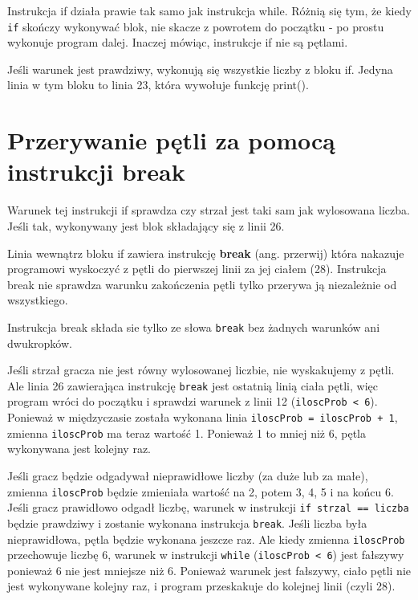 \documentclass{book}
\begin{document}
Instrukcja if działa prawie tak samo jak instrukcja while. Różnią się tym, że kiedy \lstinline{if} skończy wykonywać blok, nie skacze z powrotem do początku - po prostu wykonuje program dalej. Inaczej mówiąc, instrukcje if nie są pętlami.

Jeśli warunek jest prawdziwy, wykonują się wszystkie liczby z bloku if. Jedyna linia w tym bloku to linia 23, która wywołuje funkcję print().

\section{Przerywanie pętli za pomocą instrukcji break}



Warunek tej instrukcji if sprawdza czy strzał jest taki sam jak wylosowana liczba. Jeśli tak, wykonywany jest blok składający się z linii 26.

Linia wewnątrz bloku if zawiera instrukcję {\bf break} (ang. przerwij) która nakazuje programowi wyskoczyć z pętli do pierwszej linii za jej ciałem (28). Instrukcja break nie sprawdza warunku zakończenia pętli tylko przerywa ją niezależnie od wszystkiego.

Instrukcja break składa sie tylko ze słowa \lstinline{break} bez żadnych warunków ani dwukropków.

Jeśli strzał gracza nie jest równy wylosowanej liczbie, nie wyskakujemy z pętli. Ale linia 26 zawierająca instrukcję \lstinline{break} jest ostatnią linią ciała pętli, więc program wróci do początku i sprawdzi warunek z linii 12 (\lstinline{iloscProb < 6}). Ponieważ w międzyczasie została wykonana linia \lstinline{iloscProb = iloscProb + 1}, zmienna \lstinline{iloscProb} ma teraz wartość 1. Ponieważ 1 to mniej niż 6, pętla wykonywana jest kolejny raz.

Jeśli gracz będzie odgadywał nieprawidłowe liczby (za duże lub za małe), zmienna \lstinline{iloscProb} będzie zmieniała wartość na 2, potem 3, 4, 5 i na końcu 6. Jeśli gracz prawidłowo odgadł liczbę, warunek w instrukcji \lstinline{if strzal == liczba} będzie prawdziwy i zostanie wykonana instrukcja \lstinline{break}. Jeśli liczba była nieprawidłowa, pętla będzie wykonana jeszcze raz. Ale kiedy zmienna \lstinline{iloscProb} przechowuje liczbę 6, warunek w instrukcji \lstinline{while} (\lstinline{iloscProb < 6}) jest fałszywy ponieważ 6 nie jest mniejsze niż 6.  Ponieważ warunek jest fałszywy, ciało pętli nie jest wykonywane kolejny raz, i program przeskakuje do kolejnej linii (czyli 28).
\end{document}
